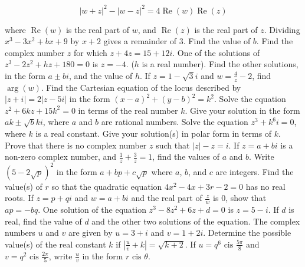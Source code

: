 \documentclass[12pt,addpoints]{exam}
\begin{document}
\begin{questions}
\[
|w + z|^2 - |w - z|^2 = 4 \operatorname{Re}(w) \operatorname{Re}(z)
\]

where \(\operatorname{Re}(w)\) is the real part of \( w \), and \(\operatorname{Re}(z)\) is the real part of \( z\).
\fillwithlines{3cm}
\question[5] Dividing \( x^3 - 3x^2 + bx + 9 \) by \( x + 2 \) gives a remainder of 3. Find the value of \( b \).
\fillwithlines{3cm}
\question[5] Find the complex number \( z \) for which \( z + 4z = 15 + 12i \).
\fillwithlines{3cm}
\question[5] One of the solutions of \( z^3 - 2z^2 + hz + 180 = 0 \) is \( z = -4 \). (\( h \) is a real number). Find the other solutions, in the form \( a \pm bi \), and the value of \( h \).
\fillwithlines{3cm}
\question[5] If \( z = 1 - \sqrt{3}i \) and \( w = \frac{4}{z} - 2 \), find \(\arg(w)\).
\fillwithlines{3cm}
\question[5] Find the Cartesian equation of the locus described by \( |z + i| = 2|z - 5i| \) in the form \((x-a)^2 + (y-b)^2 = k^2\).
\fillwithlines{3cm}
\question[5] Solve the equation \( z^2 + 6kz + 15k^2 = 0 \) in terms of the real number \( k \). Give your solution in the form \( ak \pm \sqrt{b}ki \), where \( a \) and \( b \) are rational numbers.
\fillwithlines{3cm}
\question[5] Solve the equation \( z^3 + k^6i = 0 \), where \( k \) is a real constant. Give your solution(s) in polar form in terms of \( k \).
\fillwithlines{3cm}
\question[5] Prove that there is no complex number \( z \) such that \( |z| - z = i \).
\fillwithlines{3cm}
\question[5] If \( z = a + bi \) is a non-zero complex number, and \( \frac{1}{z} + \frac{3}{\overline{z}} = 1 \), find the values of \( a \) and \( b \).
\fillwithlines{3cm}
\question[5] Write \((5 - 2\sqrt{p})^2\) in the form \(a + bp + c\sqrt{p}\) where \(a\), \(b\), and \(c\) are integers.
\fillwithlines{3cm}
\question[5] Find the value(s) of \( r \) so that the quadratic equation \( 4x^2 - 4x + 3r - 2 = 0 \) has no real roots.
\fillwithlines{3cm}
\question[5] If \( z = p + qi \) and \( w = a + bi \) and the real part of \( \frac{z}{w} \) is 0, show that \( ap = -bq \).
\fillwithlines{3cm}
\question[5] One solution of the equation \( z^3 - 8z^2 + 6z + d = 0 \) is \( z = 5 - i \). If \( d \) is real, find the value of \( d \) and the other two solutions of the equation.
\fillwithlines{3cm}
\question[5] The complex numbers \( u \) and \( v \) are given by \( u = 3 + i \) and \( v = 1 + 2i \). Determine the possible value(s) of the real constant \( k \) if \(\left| \frac{u}{v} + k \right| = \sqrt{k + 2}\).
\fillwithlines{3cm}
\question[5] If \( u = q^6 \text{ cis } \frac{5\pi}{8} \) and \( v = q^2 \text{ cis } \frac{2\pi}{5} \), write \( \frac{u}{v} \) in the form \( r \text{ cis } \theta \).

\end{questions}
\end{document}
